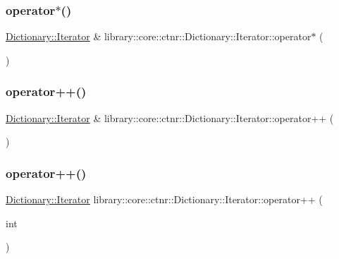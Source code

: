 \subsubsection{\texorpdfstring{operator$\ast$()}{operator*()}\hspace{0.1cm}{\footnotesize\ttfamily [2/2]}}
{\footnotesize\ttfamily \mbox{\hyperlink{classlibrary_1_1core_1_1ctnr_1_1_dictionary_1_1_iterator}{Dictionary\+::\+Iterator}} \& library\+::core\+::ctnr\+::\+Dictionary\+::\+Iterator\+::operator$\ast$ (\begin{DoxyParamCaption}{ }\end{DoxyParamCaption})}

\mbox{\label{classlibrary_1_1core_1_1ctnr_1_1_dictionary_1_1_iterator_a2eb9ccc780b8aa7feb115902f7f94d71}} 
\subsubsection{\texorpdfstring{operator++()}{operator++()}\hspace{0.1cm}{\footnotesize\ttfamily [1/2]}}
{\footnotesize\ttfamily \mbox{\hyperlink{classlibrary_1_1core_1_1ctnr_1_1_dictionary_1_1_iterator}{Dictionary\+::\+Iterator}} \& library\+::core\+::ctnr\+::\+Dictionary\+::\+Iterator\+::operator++ (\begin{DoxyParamCaption}{ }\end{DoxyParamCaption})}

\mbox{\label{classlibrary_1_1core_1_1ctnr_1_1_dictionary_1_1_iterator_a851abe701afa60b022cc605cb8d7aa65}} 
\subsubsection{\texorpdfstring{operator++()}{operator++()}\hspace{0.1cm}{\footnotesize\ttfamily [2/2]}}
{\footnotesize\ttfamily \mbox{\hyperlink{classlibrary_1_1core_1_1ctnr_1_1_dictionary_1_1_iterator}{Dictionary\+::\+Iterator}} library\+::core\+::ctnr\+::\+Dictionary\+::\+Iterator\+::operator++ (\begin{DoxyParamCaption}\item[{int}]{ }\end{DoxyParamCaption})}


